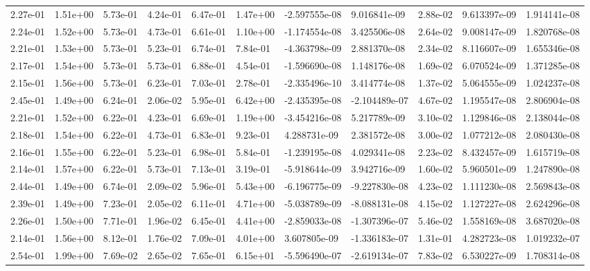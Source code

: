 \begin{longtable}{| p{} | p{} |}
2.27e-01 & 1.51e+00 & 5.73e-01 & 4.24e-01 & 6.47e-01 & 1.47e+00 & -2.597555e-08 &  9.016841e-09 &  2.88e-02 &  9.613397e-09 &  1.914141e-08 \\
2.24e-01 & 1.52e+00 & 5.73e-01 & 4.73e-01 & 6.61e-01 & 1.10e+00 & -1.174554e-08 &  3.425506e-08 &  2.64e-02 &  9.008147e-09 &  1.820768e-08 \\
2.21e-01 & 1.53e+00 & 5.73e-01 & 5.23e-01 & 6.74e-01 & 7.84e-01 & -4.363798e-09 &  2.881370e-08 &  2.34e-02 &  8.116607e-09 &  1.655346e-08 \\
2.17e-01 & 1.54e+00 & 5.73e-01 & 5.73e-01 & 6.88e-01 & 4.54e-01 & -1.596690e-08 &  1.148176e-08 &  1.69e-02 &  6.070524e-09 &  1.371285e-08 \\
2.15e-01 & 1.56e+00 & 5.73e-01 & 6.23e-01 & 7.03e-01 & 2.78e-01 & -2.335496e-10 &  3.414774e-08 &  1.37e-02 &  5.064555e-09 &  1.024237e-08 \\
2.45e-01 & 1.49e+00 & 6.24e-01 & 2.06e-02 & 5.95e-01 & 6.42e+00 & -2.435395e-08 & -2.104489e-07 &  4.67e-02 &  1.195547e-08 &  2.806904e-08 \\
2.21e-01 & 1.52e+00 & 6.22e-01 & 4.23e-01 & 6.69e-01 & 1.19e+00 & -3.454216e-08 &  5.217789e-09 &  3.10e-02 &  1.129846e-08 &  2.138044e-08 \\
2.18e-01 & 1.54e+00 & 6.22e-01 & 4.73e-01 & 6.83e-01 & 9.23e-01 &  4.288731e-09 &  2.381572e-08 &  3.00e-02 &  1.077212e-08 &  2.080430e-08 \\
2.16e-01 & 1.55e+00 & 6.22e-01 & 5.23e-01 & 6.98e-01 & 5.84e-01 & -1.239195e-08 &  4.029341e-08 &  2.23e-02 &  8.432457e-09 &  1.615719e-08 \\
2.14e-01 & 1.57e+00 & 6.22e-01 & 5.73e-01 & 7.13e-01 & 3.19e-01 & -5.918644e-09 &  3.942716e-09 &  1.60e-02 &  5.960501e-09 &  1.247890e-08 \\
2.44e-01 & 1.49e+00 & 6.74e-01 & 2.09e-02 & 5.96e-01 & 5.43e+00 & -6.196775e-09 & -9.227830e-08 &  4.23e-02 &  1.111230e-08 &  2.569843e-08 \\
2.39e-01 & 1.49e+00 & 7.23e-01 & 2.05e-02 & 6.11e-01 & 4.71e+00 & -5.038789e-09 & -8.088131e-08 &  4.15e-02 &  1.127227e-08 &  2.624296e-08 \\
2.26e-01 & 1.50e+00 & 7.71e-01 & 1.96e-02 & 6.45e-01 & 4.41e+00 & -2.859033e-08 & -1.307396e-07 &  5.46e-02 &  1.558169e-08 &  3.687020e-08 \\
2.14e-01 & 1.56e+00 & 8.12e-01 & 1.76e-02 & 7.09e-01 & 4.01e+00 &  3.607805e-09 & -1.336183e-07 &  1.31e-01 &  4.282723e-08 &  1.019232e-07 \\
2.54e-01 & 1.99e+00 & 7.69e-02 & 2.65e-02 & 7.65e-01 & 6.15e+01 & -5.596490e-07 & -2.619134e-07 &  7.83e-02 &  6.530227e-09 &  1.708314e-08 \\

\end{longtable}
